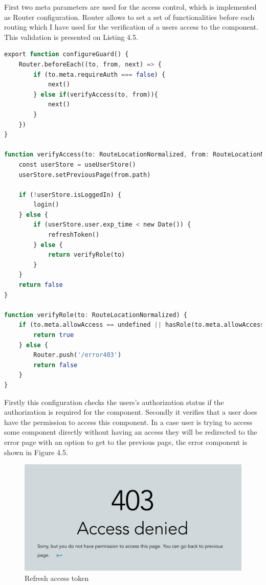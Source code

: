 \noindent First two meta parameters are used for the access control, which is implemented as Router configuration. Router allows to set a set of functionalities before each routing which I have used for the verification of a users access to the component. This validation is presented on Listing 4.5.


\begin{lstlisting}[language=Octave, caption=The example of component configuration in Router]
export function configureGuard() {
    Router.beforeEach((to, from, next) => {
        if (to.meta.requireAuth === false) {
            next()
        } else if(verifyAccess(to, from)){
            next()
        }
    })
}

function verifyAccess(to: RouteLocationNormalized, from: RouteLocationNormalized) {
    const userStore = useUserStore()
    userStore.setPreviousPage(from.path)
        
    if (!userStore.isLoggedIn) {
        login()
    } else {
        if (userStore.user.exp_time < new Date()) {
            refreshToken()
        } else {
            return verifyRole(to)
        }
    }
    return false
}

function verifyRole(to: RouteLocationNormalized) {
    if (to.meta.allowAccess == undefined || hasRole(to.meta.allowAccess as Role)) {
        return true
    } else {
        Router.push('/error403')
        return false
    }
}
\end{lstlisting}

\noindent Firstly this configuration checks the users's authorization status if the authorization is required for the component. Secondly it verifies that a user does have the permission to access this component. In a case user is trying to access some component directly without having an access they will be redirected to the error page with an option to get to the previous page, the error component is shown in Figure 4.5.

\begin{figure}[hp]
\centering
\includegraphics[scale=0.5]{../png/access_denied.png}
\caption{Refresh access token}
\end{figure}




